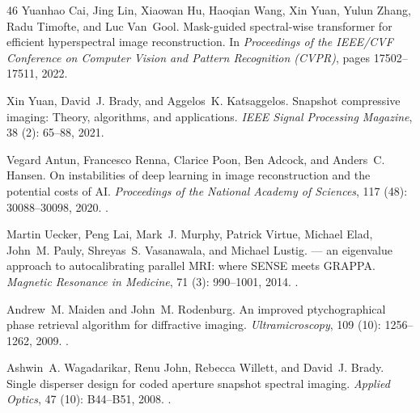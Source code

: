 \documentclass[11pt]{article}
\begin{document}
\begin{thebibliography}{46}
Yuanhao Cai, Jing Lin, Xiaowan Hu, Haoqian Wang, Xin Yuan, Yulun Zhang, Radu
  Timofte, and Luc Van~Gool.
\newblock Mask-guided spectral-wise transformer for efficient hyperspectral
  image reconstruction.
\newblock In \emph{Proceedings of the IEEE/CVF Conference on Computer Vision
  and Pattern Recognition (CVPR)}, pages 17502--17511, 2022{}.

Xin Yuan, David~J. Brady, and Aggelos~K. Katsaggelos.
\newblock Snapshot compressive imaging: Theory, algorithms, and applications.
\newblock \emph{IEEE Signal Processing Magazine}, 38 (2):
  65--88, 2021{}.

Vegard Antun, Francesco Renna, Clarice Poon, Ben Adcock, and Anders~C. Hansen.
\newblock On instabilities of deep learning in image reconstruction and the
  potential costs of {AI}.
\newblock \emph{Proceedings of the National Academy of Sciences}, 117
  (48): 30088--30098, 2020.
\newblock {}.

Martin Uecker, Peng Lai, Mark~J. Murphy, Patrick Virtue, Michael Elad, John~M.
  Pauly, Shreyas~S. Vasanawala, and Michael Lustig.
 --- an eigenvalue approach to autocalibrating parallel
  {MRI}: where {SENSE} meets {GRAPPA}.
\newblock \emph{Magnetic Resonance in Medicine}, 71 (3):
  990--1001, 2014.
\newblock {}.

Andrew~M. Maiden and John~M. Rodenburg.
\newblock An improved ptychographical phase retrieval algorithm for diffractive
  imaging.
\newblock \emph{Ultramicroscopy}, 109 (10): 1256--1262, 2009.
\newblock {}.

Ashwin~A. Wagadarikar, Renu John, Rebecca Willett, and David~J. Brady.
\newblock Single disperser design for coded aperture snapshot spectral imaging.
\newblock \emph{Applied Optics}, 47 (10): B44--B51, 2008.
\newblock {}.


\end{thebibliography}
\end{document}
